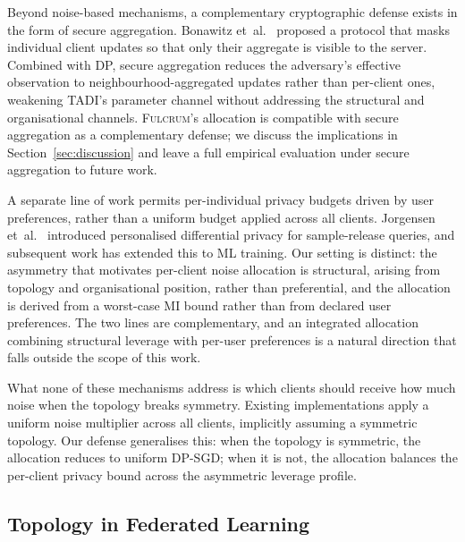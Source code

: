 \documentclass[letterpaper,journal]{IEEEtran}
\newcommand{\TADI}{\textsc{TADI}\xspace}
\newcommand{\Fulcrum}{\textsc{Fulcrum}\xspace}
\begin{document}
Beyond noise-based mechanisms, a complementary cryptographic defense
exists in the form of secure aggregation. Bonawitz
et~al.~\cite{bonawitz2017secagg} proposed a protocol that masks
individual client updates so that only their aggregate is visible to
the server. Combined with DP, secure aggregation reduces the
adversary's effective observation to neighbourhood-aggregated updates
rather than per-client ones, weakening \TADI's parameter channel
without addressing the structural and organisational channels.
\Fulcrum's allocation is compatible with secure aggregation as a
complementary defense; we discuss the implications in Section~\ref{sec:discussion} and
leave a full empirical evaluation under secure aggregation to future work.

A separate line of work permits per-individual privacy budgets driven
by user preferences, rather than a uniform budget applied across all
clients. Jorgensen et~al.~\cite{jorgensen2015personalized} introduced
personalised differential privacy for sample-release queries, and
subsequent work has extended this to ML training. Our setting is
distinct: the asymmetry that motivates per-client noise allocation is
structural, arising from topology and organisational position, rather
than preferential, and the allocation is derived from a worst-case MI
bound rather than from declared user preferences. The two lines are
complementary, and an integrated allocation combining structural
leverage with per-user preferences is a natural direction that falls outside the scope of this work.

What none of these mechanisms address is which clients should receive
how much noise when the topology breaks symmetry. Existing
implementations apply a uniform noise multiplier across all clients,
implicitly assuming a symmetric topology. Our defense generalises
this: when the topology is symmetric, the allocation reduces to
uniform DP-SGD; when it is not, the allocation balances the
per-client privacy bound across the asymmetric leverage profile.

\subsection{Topology in Federated Learning}
\label{sec:related-topology}
\end{document}
